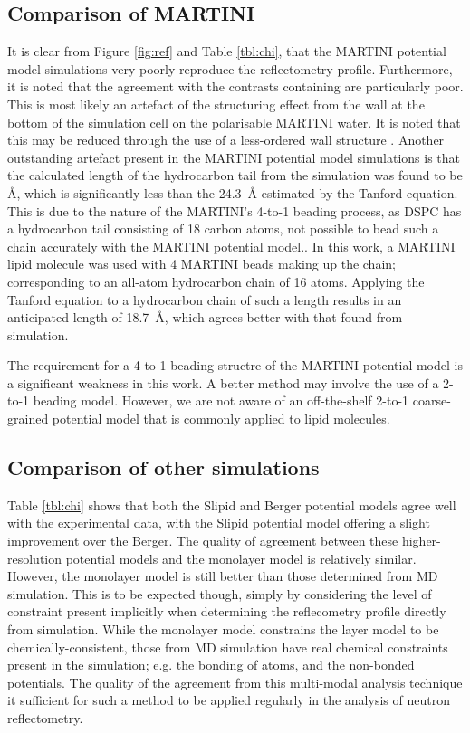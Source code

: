 \documentclass[amsmath,amssymb,twocolumn,superscriptaddress]{revtex4-1}
\begin{document}
\subsection{Comparison of MARTINI}
It is clear from Figure \ref{fig:ref} and Table \ref{tbl:chi}, that the
MARTINI potential model simulations very poorly reproduce the reflectometry
profile.
Furthermore, it is noted that the agreement with the contrasts containing
 are particularly poor.
This is most likely an artefact of the structuring effect from the wall at
the bottom of the simulation cell on the polarisable MARTINI water.
It is noted that this may be reduced through the use of a less-ordered wall
structure \cite{koutsioubas_combined_2016}.
Another outstanding artefact present in the MARTINI potential model
simulations is that the calculated length of the hydrocarbon tail from the
simulation was found to be
\si{\angstrom}, which is
significantly less than the \SI{24.3}{\angstrom} estimated by the Tanford
equation.
This is due to the nature of the MARTINI's 4-to-1 beading process, as DSPC
has a hydrocarbon tail consisting of 18 carbon atoms, not possible to bead
such a chain accurately with the MARTINI potential model..
In this work, a MARTINI lipid molecule was used with 4 MARTINI beads making
up the chain; corresponding to an all-atom hydrocarbon chain of 16 atoms.
Applying the Tanford equation to a hydrocarbon chain of such a length
results in an anticipated length of \SI{18.7}{\angstrom}, which agrees
better with that found from simulation.

The requirement for a 4-to-1 beading structre of the MARTINI potential model
is a significant weakness in this work.
A better method may involve the use of a 2-to-1 beading model.
However, we are not aware of an off-the-shelf 2-to-1 coarse-grained
potential model that is commonly applied to lipid molecules.

\subsection{Comparison of other simulations}
Table \ref{tbl:chi} shows that both the Slipid and Berger potential models
agree well with the experimental data, with the Slipid potential model
offering a slight improvement over the Berger.
The quality of agreement between these higher-resolution potential models
and the monolayer model is relatively similar.
However, the monolayer model is still better than those determined from MD
simulation.
This is to be expected though, simply by considering the level of
constraint present implicitly when determining the reflecometry profile
directly from simulation.
While the monolayer model constrains the layer model to be
chemically-consistent, those from MD simulation have real chemical
constraints present in the simulation; e.g. the bonding of atoms, and
the non-bonded potentials.
The quality of the agreement from this multi-modal analysis technique
it sufficient for such a method to be applied regularly in the analysis
of neutron reflectometry.
\end{document}
